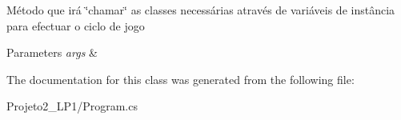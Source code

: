 Método que irá \char`\"{}chamar\char`\"{} as classes necessárias através de variáveis de instância para efectuar o ciclo de jogo 


\begin{DoxyParams}{Parameters}
{\em args} & \\
\hline
\end{DoxyParams}


The documentation for this class was generated from the following file\+:\begin{DoxyCompactItemize}
\item 
Projeto2\+\_\+\+L\+P1/Program.\+cs\end{DoxyCompactItemize}
